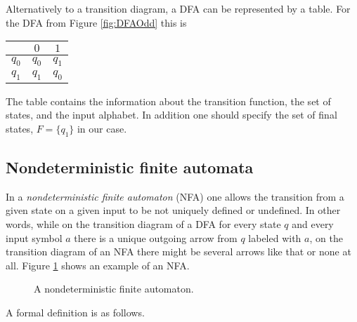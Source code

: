 \begin{page}
\setcounter{section}{1}
\setcounter{subsection}{2}
\setcounter{dfn}{5}
\label{portion:1027}

\begin{rem}
Alternatively to a transition diagram, a DFA can be represented by a table.
For the DFA from Figure \ref{fig:DFAOdd} this is
\begin{center}
\begin{tabular}{c|cc}
& $0$ & $1$\\
\hline
$q_0$ & $q_0$ & $q_1$\\
$q_1$ & $q_1$ & $q_0$
\end{tabular}
\end{center}
The table contains the information about the transition function, the set of states, and the input alphabet.
In addition one should specify the set of final states, $F = \{q_1\}$ in our case.
\end{rem}

\end{page}

\begin{page}
\setcounter{section}{1}
\setcounter{subsection}{3}
\setcounter{dfn}{5}
\label{portion:1030}

\subsection{Nondeterministic finite automata}
In a \emph{nondeterministic finite automaton} (NFA) one allows the transition from a given state on a given input to be not uniquely defined or undefined.
In other words, while on the transition diagram of a DFA for every state $q$ and every input symbol $a$ there is a unique outgoing arrow from $q$ labeled with $a$,
on the transition diagram of an NFA there might be several arrows like that or none at all.
Figure \ref{fig:NFA} shows an example of an NFA.

\begin{figure}[htb]
\begin{center}

\end{center}
\caption{A nondeterministic finite automaton.}
\label{fig:NFA}
\end{figure}

A formal definition is as follows.

\end{page}

